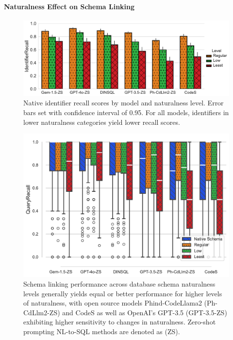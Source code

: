 \paragraph{\textbf{Naturalness Effect on Schema Linking}}

\begin{figure}
  \centering
  \includegraphics[width=\figwidthmod\linewidth]{figures/identifier-recall.pdf}
  \caption{Native identifier recall scores by model and naturalness level. Error bars set with confidence interval of 0.95. For all models, identifiers in lower naturalness categories yield lower recall scores.}
  \label{fig:identifier-recall}
\end{figure}

\begin{figure}
  \centering
  \includegraphics[width=\figwidthmod\linewidth]{figures/recall-boxplot-db-combined.pdf}
  \caption{Schema linking performance across database schema naturalness levels generally yields equal or better performance for higher levels of naturalness, with open source models Phind-CodeLlama2 (Ph-CdLlm2-ZS) and CodeS as well as OpenAI's GPT-3.5 (GPT-3.5-ZS) exhibiting higher sensitivity to changes in naturalness. Zero-shot prompting NL-to-SQL methods are denoted as (ZS).}
  \label{fig:modelrecallnaturalnesslevels}
\end{figure}


